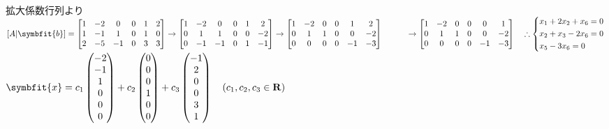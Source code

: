 \noindent
{}\\
拡大係数行列より\\
$[A|\symbfit{b}]=
\begin{bmatrix}
    1 & -2 & 0 & 0 & 1 & 2 \\
    1 & -1 & 1 & 0 & 1 & 0 \\
    2 & -5 & -1 & 0 & 3 & 3 
\end{bmatrix} \rightarrow
\begin{bmatrix}
    1 & -2 & 0 & 0 & 1 & 2 \\
    0 & 1 & 1 & 0 & 0 & -2 \\
    0 & -1 & -1 & 0 & 1 & -1 
\end{bmatrix}\rightarrow
\begin{bmatrix}
    1 & -2 & 0 & 0 & 1 & 2 \\
    0 & 1 & 1 & 0 & 0 & -2 \\
    0 & 0 & 0 & 0 & -1 & -3
\end{bmatrix}\\ \hspace{1cm}\rightarrow
\begin{bmatrix}
    1 & -2 & 0 & 0 & 0 & 1 \\
    0 & 1 & 1 & 0 & 0 & -2 \\
    0 & 0 & 0 & 0 & -1 & -3    
\end{bmatrix}\quad \therefore
\begin{cases*}
    x_1+2x_2+x_6=0\\
    x_2+x_3-2x_6=0 \\
    x_5-3x_6=0
\end{cases*}$\\
\qquad$\symbfit{x}=c_1
\begin{pmatrix}
    -2 \\ -1 \\ 1 \\ 0 \\ 0 \\ 0
\end{pmatrix}+c_2
\begin{pmatrix}
    0 \\ 0 \\ 0 \\ 1 \\ 0 \\ 0
\end{pmatrix}+c_3
\begin{pmatrix}
    -1 \\ 2 \\ 0 \\ 0 \\ 3 \\ 1
\end{pmatrix} \quad (c_1,c_2,c_3 \in \mathbf{R})$\\
